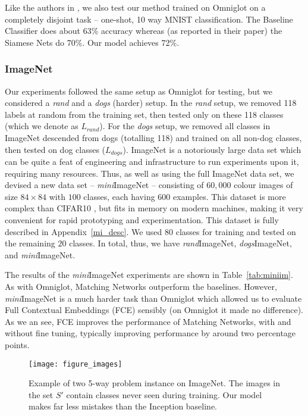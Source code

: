 Like the authors in \cite{siamese}, we also test our method trained on Omniglot on a completely disjoint task -- one-shot, 10 way MNIST classification. The Baseline Classifier does about 63\% accuracy whereas (as reported in their paper) the Siamese Nets do 70\%. Our model achieves 72\%.

\subsubsection{ImageNet}
\label{sec:imagenet}

Our experiments followed the same setup as Omniglot for testing, but we considered a \emph{rand} and a \emph{dogs} (harder) setup. In the \emph{rand} setup, we removed 118 labels at random from the training set, then tested only on these 118 classes (which we denote as $L_{rand}$). For the \emph{dogs} setup, we removed all classes in ImageNet descended from dogs (totalling 118) and trained on all non-dog classes, then tested on dog classes ($L_{dogs}$).
ImageNet is a notoriously large data set which can be quite a feat of engineering and infrastructure to run experiments upon it, requiring many resources.
Thus, as well as using the full ImageNet data set, we devised a new data set -- \emph{mini}ImageNet -- consisting of $60,000$ colour images of size $84\times 84$ with $100$ classes, each having $600$ examples. This dataset is more complex than CIFAR10 \cite{krizhevsky2010convolutional}, but fits in memory on modern machines, making it very convenient for rapid prototyping and experimentation. This dataset is fully described in Appendix~\ref{mi_desc}.
We used $80$ classes for training and tested on the remaining $20$ classes.
In total, thus, we have \emph{rand}ImageNet, \emph{dogs}ImageNet, and \emph{mini}ImageNet.

The results of the \emph{mini}ImageNet experiments are shown in Table~\ref{tab:miniim}. As with Omniglot, Matching Networks outperform the baselines.
However, \emph{mini}ImageNet is a much harder task than Omniglot which allowed us to evaluate Full Contextual Embeddings (FCE) sensibly (on Omniglot it made no difference).
As we an see, FCE improves the performance of Matching Networks, with and without fine tuning, typically improving performance by around two percentage points. 

\begin{figure}[t]
\centering
\texttt{[image: figure\_images]}
\caption{\label{fig:imgs}Example of two 5-way problem instance on ImageNet. The images in the set $S'$ contain classes never seen during training. Our model makes far less mistakes than the Inception baseline. }
\end{figure}

